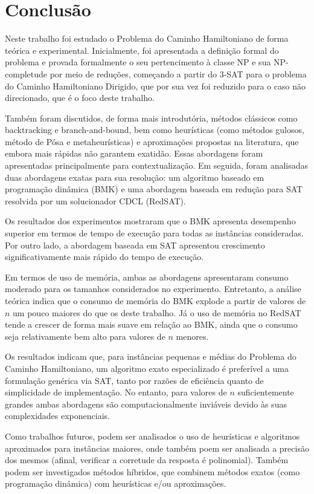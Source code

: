 \section{Conclusão}

Neste trabalho foi estudado o Problema do Caminho Hamiltoniano de forma teórica e experimental. Inicialmente, foi apresentada a definição formal do problema e provada formalmente o seu pertencimento à classe NP e sua NP-completude por meio de reduções, começando a partir do 3-SAT para o problema do Caminho Hamiltoniano Dirigido, que por sua vez foi reduzido para o caso não direcionado, que é o foco deste trabalho. 

Também foram discutidos, de forma mais introdutória, métodos clássicos como backtracking e branch-and-bound, bem como heurísticas (como métodos gulosos, método de Pósa e metaheurísticas) e aproximações propostas na literatura, que embora mais rápidas não garantem exatidão. Essas abordagens foram apresentadas principalmente para contextualização. Em seguida, foram analisadas duas abordagens exatas para sua resolução: um algoritmo baseado em programação dinâmica (BMK) e uma abordagem baseada em redução para SAT resolvida por um solucionador CDCL (RedSAT).

Os resultados dos experimentos mostraram que o  BMK apresenta desempenho superior em termos de tempo de execução para todas as instâncias consideradas. Por outro lado, a abordagem baseada em SAT apresentou crescimento significativamente mais rápido do tempo de execução.

Em termos de uso de memória, ambas as abordagens apresentaram consumo moderado para os tamanhos considerados no experimento. Entretanto, a análise teórica indica que o consumo de memória do BMK explode a partir de valores de $n$ um pouco maiores do que os deste trabalho. Já o uso de memória no RedSAT tende a crescer de forma mais suave em relação ao BMK, ainda que o consumo seja relativamente bem alto para valores de $n$ menores.

Os resultados indicam que, para instâncias pequenas e médias do Problema do Caminho Hamiltoniano, um algoritmo exato especializado é preferível a uma formulação genérica via SAT, tanto por razões de eficiência quanto de simplicidade de implementação. No entanto, para valores de $n$ suficientemente grandes ambas abordagens são computacionalmente inviáveis devido às suas complexidades exponenciais.

Como trabalhos futuros, podem ser analisados o uso de heurísticas e algoritmos aproximados para instâncias maiores, onde também poem ser analisada a precisão dos mesmos (afinal, verificar a corretude da resposta é polinomial). Também podem ser investigados métodos híbridos, que combinem métodos exatos (como programação dinâmica) com heurísticas e/ou aproximações.